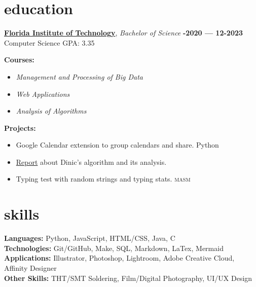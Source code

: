 \documentclass[margin,10pt]{res}
\begin{document}
\begin{resume}

    \section{\sc \lsstyle education}
        \href{https://www.fit.edu/}{\textbf{Florida Institute of Technology}}, \textit{Bachelor of Science}
        \hfill
        \textsc{\bfseries{}-2020 --- 12-2023}
        \\
        Computer Science
        \hfill
        GPA: 3.35
        \vspace{0.5em}
        \begin{description}
            \item[\textbf{Courses:}]
        \end{description}
        \begin{itemize}
            \item \textit{Management and Processing of Big Data}
            \item \textit{Web Applications}
            \item \textit{Analysis of Algorithms}
        \end{itemize}
        \begin{description}
            \item[\textbf{Projects:}]
        \end{description}
        \begin{itemize}
            \item Google Calendar extension to group calendars and share.
            \hfill
            Python
            \item \href{https://github.com/gronk-droid/cse4081/blob/607f375da2e1c2aedf6d1330a80537ea768698d2/2_group_assignment/docs/report.pdf}{Report} about Dinic's algorithm and its analysis.
            \item Typing test with random strings and typing stats.
            \hfill
            \textsc{masm}
        \end{itemize}

    \section{\sc \lsstyle skills}
        \textbf{Languages:} Python, JavaScript, \textsc{HTML/CSS}, Java, C           \\
        \textbf{Technologies:} Git/GitHub, Make, SQL, Markdown, LaTex, Mermaid          \\
        \textbf{Applications:} Illustrator, Photoshop, Lightroom, Adobe Creative Cloud, Affinity Designer\\
        \textbf{Other Skills:} \textsc{THT/SMT} Soldering, Film/Digital Photography, UI/UX Design


\end{resume}
\end{document}
